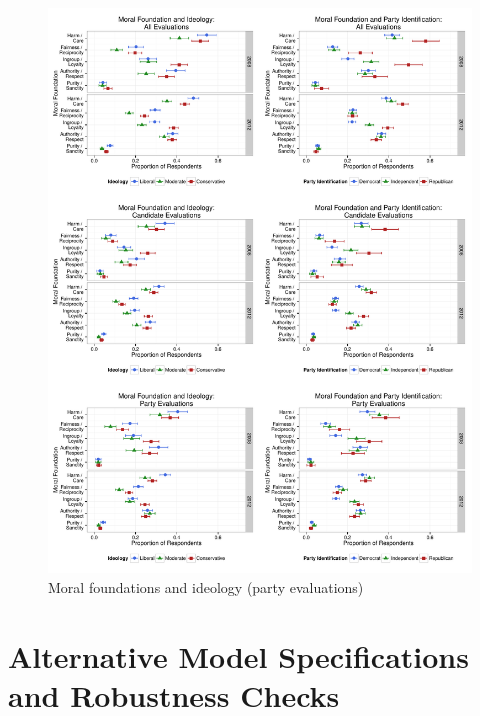 \documentclass[12pt]{article}
\begin{document}
\begin{figure}[h]\centering
\includegraphics[scale=.4]{../calc/fig/appCprop.pdf}
\caption{Moral foundations and ideology (party evaluations)}\label{fig:appCprop}
\end{figure}

\clearpage
\section{Alternative Model Specifications and Robustness Checks}\label{app:robust}
\renewcommand\thefigure{\thesection.\arabic{figure}}
\renewcommand\thetable{\thesection.\arabic{table}}
\setcounter{figure}{0}
\setcounter{table}{0}

\end{document}
